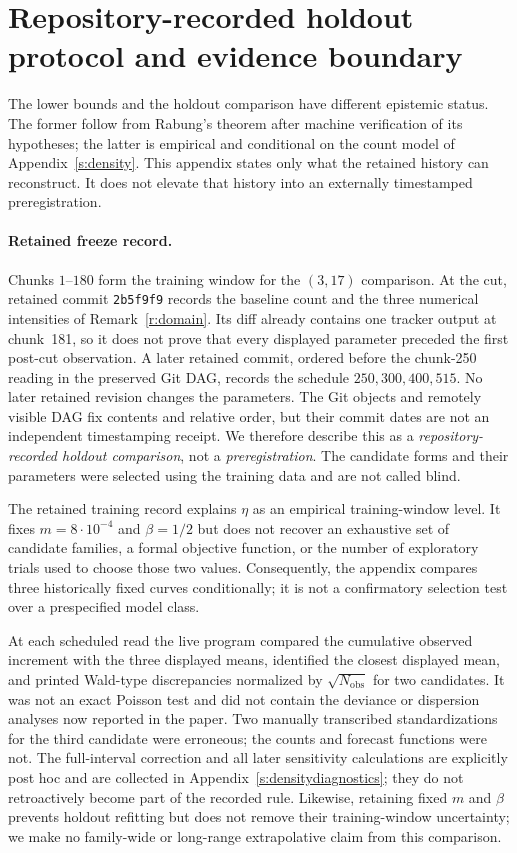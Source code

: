 \section{Repository-recorded holdout protocol and evidence boundary}\label{s:prereg}

The lower bounds and the holdout comparison have different epistemic status.
The former follow from Rabung's theorem after machine verification of its
hypotheses; the latter is empirical and conditional on the count model of
Appendix~\ref{s:density}. This appendix states only what the retained history
can reconstruct. It does not elevate that history into an externally
timestamped preregistration.

\paragraph{Retained freeze record.}
Chunks $1$--$180$ form the training window for the $(3,17)$ comparison.  At
the cut, retained commit \texttt{2b5f9f9} records the baseline count and the
three numerical intensities of Remark~\ref{r:domain}. Its diff already contains
one tracker output at chunk~181, so it does not prove that every displayed
parameter preceded the first post-cut observation. A later retained commit,
ordered before the chunk-250 reading in the preserved Git DAG, records the
schedule $250,300,400,515$. No later retained revision changes the parameters.
The Git objects and remotely visible DAG fix contents and relative order, but
their commit dates are not an independent timestamping receipt. We therefore
describe this as a \emph{repository-recorded holdout comparison}, not a
\emph{preregistration}. The candidate forms and their parameters were selected using
the training data and are not called blind.

The retained training record explains $\eta$ as an empirical training-window
level. It fixes $m=8\cdot10^{-4}$ and $\beta=1/2$ but does not recover an
exhaustive set of candidate families, a formal objective function, or the
number of exploratory trials used to choose those two values. Consequently,
the appendix compares three historically fixed curves conditionally; it is
not a confirmatory selection test over a prespecified model class.

At each scheduled read the live program compared the cumulative observed
increment with the three displayed means, identified the closest displayed
mean, and
printed Wald-type discrepancies normalized by $\sqrt{N_{\mathrm{obs}}}$ for
two candidates.  It was not an exact Poisson test and did not contain the
deviance or dispersion analyses now reported in the paper.  Two manually
transcribed standardizations for the third candidate were erroneous; the
counts and forecast functions were not.  The full-interval correction and all
later sensitivity calculations are explicitly post hoc and are collected in
Appendix~\ref{s:densitydiagnostics}; they do not retroactively become part of
the recorded rule. Likewise, retaining fixed $m$ and $\beta$ prevents holdout
refitting but does not remove their training-window uncertainty; we make no
family-wide or long-range extrapolative claim from this comparison.

